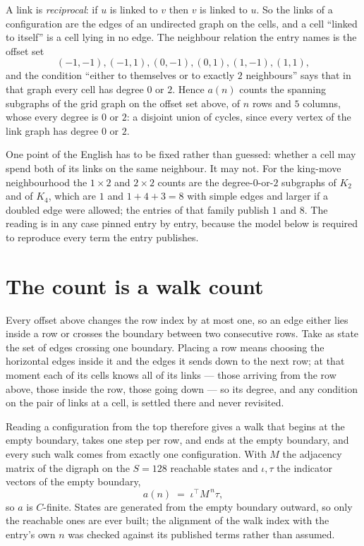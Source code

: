 \documentclass[11pt,a4paper]{article}
\theoremstyle{plain}
\theoremstyle{definition}
\begin{document}
A link is \emph{reciprocal}: if $u$ is linked to $v$ then $v$ is linked to $u$. So the links
of a configuration are the edges of an undirected graph on the cells, and a cell ``linked to
itself'' is a cell lying in no edge. The neighbour relation the entry names is the offset set
\[
(-1,-1), (-1,1), (0,-1), (0,1), (1,-1), (1,1),
\]
and the condition ``either to themselves or to exactly $2$ neighbours'' says that in that
graph every cell has degree $0$ or $2$. Hence $a(n)$ counts the spanning subgraphs of the
grid graph on the offset set above, of $n$ rows and $5$ columns,
whose every degree is $0$ or $2$: a disjoint union of cycles, since every vertex of the link graph has degree $0$ or $2$.

One point of the English has to be fixed rather than guessed: whether a cell may spend both of
its links on the same neighbour. It may not. For the king-move neighbourhood the $1\times2$
and $2\times2$ counts are the degree-$0$-or-$2$ subgraphs of $K_2$ and of $K_4$, which are $1$
and $1+4+3=8$ with simple edges and larger if a doubled edge were allowed; the entries of that
family publish $1$ and $8$. The reading is in any case pinned entry by entry, because the
model below is required to reproduce every term the entry publishes.


\section{The count is a walk count}

Every offset above changes the row index by at most one, so an edge either lies inside a row
or crosses the boundary between two consecutive rows. Take as state the set of edges crossing
one boundary. Placing a row means choosing the horizontal edges inside it and the edges it
sends down to the next row; at that moment each of its cells knows all of its links --- those
arriving from the row above, those inside the row, those going down --- so its degree, and any
condition on the pair of links at a cell, is settled there and never revisited.

Reading a configuration from the top therefore gives a walk that begins at the empty boundary,
takes one step per row, and ends at the empty boundary, and every such walk comes from exactly
one configuration. With $M$ the adjacency matrix of the digraph on the $S=128$ reachable
states and $\iota,\tau$ the indicator vectors of the empty boundary,
\[
a(n)\;=\;\iota^{\!\top}M^{\,n}\tau ,
\]
so $a$ is $C$-finite. States are generated from the empty boundary outward, so only the
reachable ones are ever built; the alignment of the walk index with the entry's own $n$ was
checked against its published terms rather than assumed.
\end{document}
